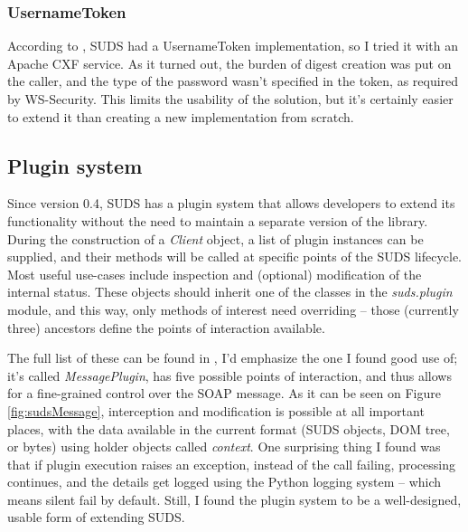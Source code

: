 \subsubsection{UsernameToken}
\label{sudsUsernameToken}

According to \cite{suds-doc}, SUDS had a UsernameToken implementation, so I tried it with an Apache CXF service. As it turned out, the burden of digest creation was put on the caller, and the type of the password wasn't specified in the token, as required by WS\hyp{}Security. This limits the usability of the solution, but it's certainly easier to extend it than creating a new implementation from scratch.

\subsection{Plugin system}
\label{sudsPlugins}

Since version 0.4, SUDS has a plugin system that allows developers to extend its functionality without the need to maintain a separate version of the library. During the construction of a \emph{Client} object, a list of plugin instances can be supplied, and their methods will be called at specific points of the SUDS lifecycle. Most useful use-cases include inspection and (optional) modification of the internal status. These objects should inherit one of the classes in the \emph{suds.plugin} module, and this way, only methods of interest need overriding -- those (currently three) ancestors define the points of interaction available.

The full list of these can be found in \cite{suds-doc}, I'd emphasize the one I found good use of; it's called \emph{MessagePlugin}, has five possible points of interaction, and thus allows for a fine-grained control over the SOAP message. As it can be seen on Figure \ref{fig:sudsMessage}, interception and modification is possible at all important places, with the data available in the current format (SUDS objects, DOM tree, or bytes) using holder objects called \emph{context}. One surprising thing I found was that if plugin execution raises an exception, instead of the call failing, processing continues, and the details get logged using the Python logging system -- which means silent fail by default. Still, I found the plugin system to be a well-designed, usable form of extending SUDS.
